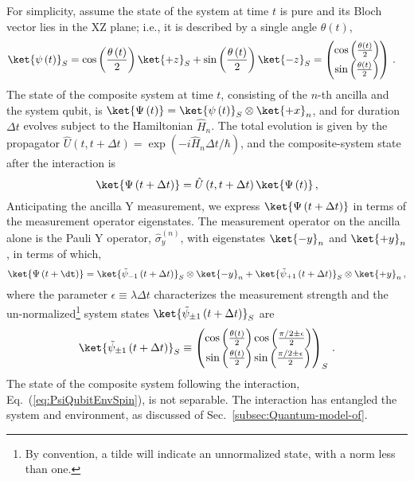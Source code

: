 For simplicity, assume the state of the system at time $t$ is pure
and its Bloch vector lies in the XZ plane; i.e., it is described by
a single angle $\theta\left(t\right)$, 
\begin{align}
\ket{\psi\left(t\right)}_{S} & =\cos\left(\frac{\theta\left(t\right)}{2}\right)\ket{+z}_{S}+\sin\left(\frac{\theta\left(t\right)}{2}\right)\ket{-z}_{S}=\begin{pmatrix}\cos\left(\frac{\theta\left(t\right)}{2}\right)\\
\sin\left(\frac{\theta\left(t\right)}{2}\right)
\end{pmatrix}\,.\label{eq:SpinBath:sysState}
\end{align}
The state of the composite system at time $t$, consisting of the
$n$-th ancilla and the system qubit, is $\ket{\Psi\left(t\right)}=\ket{\psi\left(t\right)}_{S}\otimes\ket{+x}_{n}$,
and for duration $\Delta t$ evolves subject to the Hamiltonian $\hat{H}_{n}$.
The total evolution is given by the propagator $\hat{U}\left(t,t+\Delta t\right)=\exp\left(-i\hat{H}_{n}\Delta t/\hbar\right)$,
and the composite-system state after the interaction is 
\begin{equation}
\ket{\Psi\left(t+\Delta t\right)}=\hat{U}\left(t,t+\Delta t\right)\ket{\Psi\left(t\right)}\,,
\end{equation}
Anticipating the ancilla Y measurement, we express $\ket{\Psi\left(t+\Delta t\right)}$
in terms of the measurement operator eigenstates. The measurement
operator on the ancilla alone is the Pauli Y operator, $\hat{\sigma}_{y}^{\left(n\right)}$,
with eigenstates $\ket{-y}_{n}$ and $\ket{+y}_{n}$, in terms of
which, 
\begin{equation}
\ket{\Psi\left(t+\dt\right)}=\ket{\tilde{\psi}_{-1}\left(t+\Delta t\right)}_{S}\otimes\ket{-y}_{n}+\ket{\tilde{\psi}_{+1}\left(t+\Delta t\right)}_{S}\otimes\ket{+y}_{n}\,,\label{eq:PsiQubitEnvSpin}
\end{equation}
where the parameter $\epsilon\equiv\lambda\Delta t$ characterizes
the measurement strength and the un-normalized\footnote{By convention, a tilde will indicate an unnormalized state, with a
norm less than one.} system states $\ket{\tilde{\psi}_{\pm1}\left(t+\Delta t\right)}_{S}$
are
\begin{equation}
\ket{\tilde{\psi}_{\pm1}\left(t+\Delta t\right)}_{S}\equiv\begin{pmatrix}\cos\left(\frac{\theta\left(t\right)}{2}\right)\cos\left(\frac{\pi/2\pm\epsilon}{2}\right)\\
\sin\left(\frac{\theta\left(t\right)}{2}\right)\sin\left(\frac{\pi/2\pm\epsilon}{2}\right)
\end{pmatrix}_{S}\,.\label{eq:SpinBath:psiTilde}
\end{equation}
The state of the composite system following the interaction, Eq.~(\ref{eq:PsiQubitEnvSpin}),
is not separable. The interaction has entangled the system and environment,
as discussed of Sec.~\ref{subsec:Quantum-model-of}.


